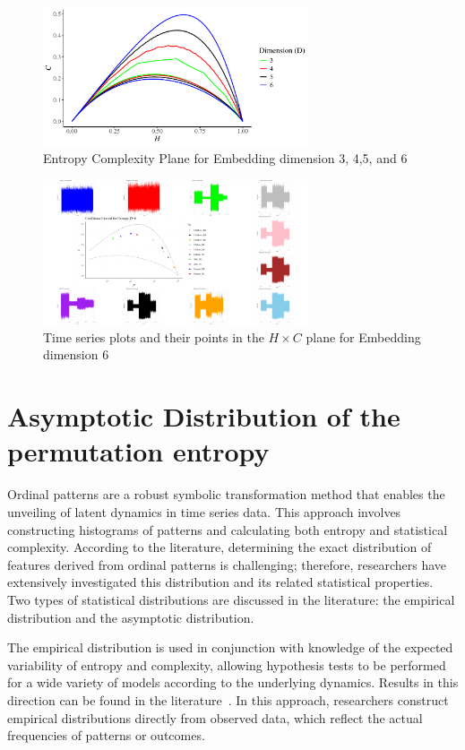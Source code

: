 \begin{figure}[H]
	\centering
	\includegraphics[width=0.7\textwidth]{complexity plane}
	\caption{Entropy Complexity Plane for Embedding dimension 3, 4,5, and 6}
	\label{fig:complexity}
\end{figure}


\begin{figure}[H]
	\centering
	\includegraphics[width=0.7\textwidth]{combined plot}
	\caption{Time series plots and their points in the $H \times C$ plane for Embedding dimension 6}
	\label{fig:tentimeseries}
\end{figure}

\section{Asymptotic Distribution of the permutation entropy}\label{Sec:AsymptoticDistribution}
Ordinal patterns are a robust symbolic transformation method that enables the unveiling of latent dynamics in time series data. This approach involves constructing histograms of patterns and calculating both entropy and statistical complexity. According to the literature, determining the exact distribution of features derived from ordinal patterns is challenging; therefore, researchers have extensively investigated this distribution and its related statistical properties. Two types of statistical distributions are discussed in the literature: the empirical distribution and the asymptotic distribution.

The empirical distribution is used in conjunction with knowledge of the expected variability of entropy and complexity, allowing hypothesis tests to be performed for a wide variety of models according to the underlying dynamics. Results in this direction can be found in the literature~\cite{Chagas2022a, DeMicco2008, Larrondo2005, Larrondo2006}. In this approach, researchers construct empirical distributions directly from observed data, which reflect the actual frequencies of patterns or outcomes.

